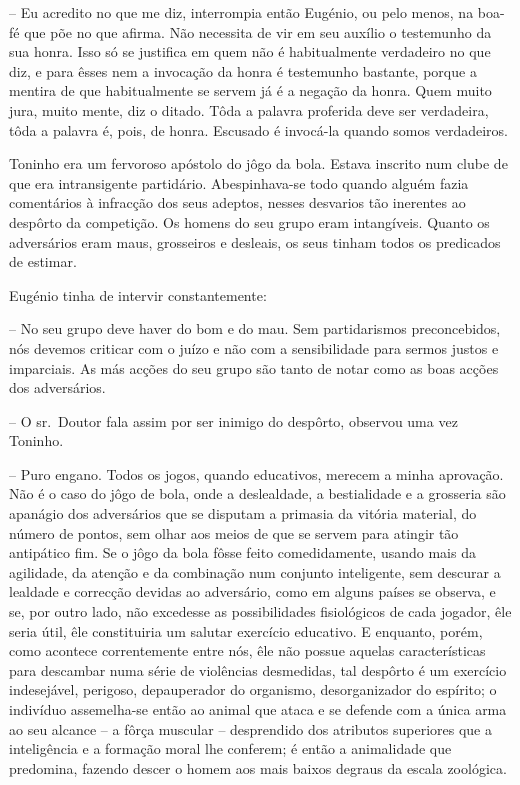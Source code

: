 \documentclass[9pt]{article}
\begin{document}
-- Eu acredito no que me diz, interrompia então Eugé\-nio, ou pelo
menos, na boa-fé que põe no que afirma. Não necessita de vir em seu
auxílio o testemunho da sua honra. Isso só se justifi\-ca em quem não
é habitualmente verdadeiro no que diz, e para êsses nem a invoca\-ção
da honra é testemunho bastante, porque a mentira de que habitualmente
se servem já é a nega\-ção da honra. Quem muito jura, muito mente, diz o
ditado. Tôda a palavra proferida deve ser verdadeira, tôda a palavra
é, pois, de honra. Escusado é invocá-la quan\-do somos verdadeiros.

Toninho era um fervoroso apóstolo do jôgo da bola. Estava inscrito num clube de que era intransigente partidário. Abespinhava-se
todo quan\-do alguém fazia comentários à infrac\-ção dos seus adeptos, nesses desvarios tão inerentes ao despôrto da competi\-ção. Os homens do
seu grupo eram intangíveis. Quanto os adversários eram maus, grosseiros e desleais, os seus tinham todos os predicados de estimar.

Eugé\-nio tinha de intervir constantemente:

-- No seu grupo deve haver do bom e do mau. Sem partidarismos preconcebidos, nós devemos criticar com o juízo e não com a sensibilidade
para sermos justos e imparciais. As más ac\-ções do seu grupo são tanto
de notar como as boas ac\-ções dos adversários.

-- O sr.\ Doutor fala assim por ser inimigo do despôrto, observou
uma vez Toninho.

-- Puro engano. Todos os jogos, quan\-do educativos, merecem a minha
aprova\-ção. Não é o caso do jôgo de bola, onde a deslealdade, a bestialidade e a grosseria são apanágio dos adversários que se disputam
a primasia da vitória material, do número de pontos, sem o\-lhar aos meios
de que se servem para atingir tão antipático fim. Se o jôgo da bola fôsse feito comedidamente, usando mais da agilidade, da aten\-ção e da combina\-ção num conjunto inteligente, sem descurar a lealdade e cor\-recção
devidas ao adversário, como em alguns países se observa, e se, por outro
lado, não excedesse as possibilidades fisiológicos de cada jogador, êle
seria útil, êle constituiria um salutar exercício educativo. E enquanto,
porém, como acontece correntemente entre nós, êle não possue aquelas
características para descambar numa série de violências desmedidas, tal
despôrto é um exercício indesejável, perigoso, depauperador do organismo, desorganizador do espírito; o indivíduo asseme\-lha-se então ao animal que ataca e se defende com a única arma ao seu alcance -- a fôrça
muscular -- desprendido dos atributos superiores que a inteligência e
a forma\-ção moral lhe conferem; é então a animalidade que predomina, fazendo descer o homem aos mais baixos degraus da escala zoológica.
\end{document}
